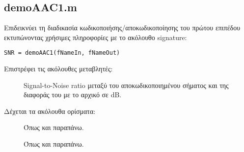 

\subsection*{demoAAC1.m}
Επιδεικνύει τη διαδικασία κωδικοποιήσης/αποκωδικοποίησης του πρώτου επιπέδου
εκτυπώνοντας χρήσιμες πληροφορίες με το ακόλουθο signature:
\begin{center}
	\verb|SNR = demoAAC1(fNameIn, fNameOut)|
\end{center}

\noindent Επιστρέφει τις ακόλουθες μεταβλητές:
\begin{description}
\item[] Signal-to-Noise ratio μεταξύ του αποκωδικοποιημένου σήματος και
	της διαφοράς του με το αρχικό σε dB.
\end{description}

\noindent Δέχεται τα ακόλουθα ορίσματα:
\begin{description}
\item[] Όπως και παραπάνω.
\item[] Όπως και παραπάνω.
\end{description}
